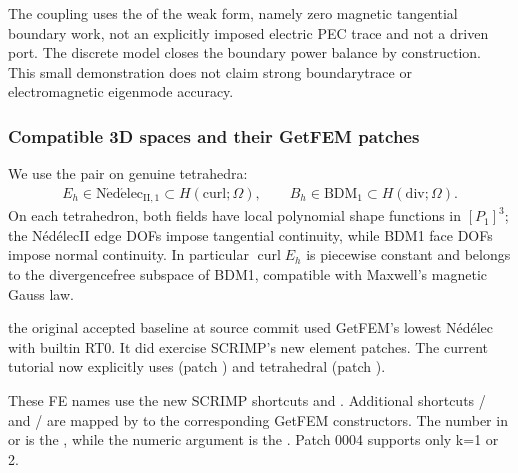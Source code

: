 \documentclass[letterpaper,10pt,english]{sphinxmanual}
\begin{document}
\sphinxAtStartPar
The coupling uses the  of the weak form, namely
zero magnetic tangential boundary work, not an
explicitly imposed electric PEC trace and not
a driven port. The discrete model closes the
boundary power balance by construction. This
small demonstration does not claim strong
boundary\sphinxhyphen{}trace or electromagnetic eigenmode
accuracy.


\subsubsection{Compatible 3D spaces and their GetFEM patches}
\label{\detokenize{examples/maxwell_3d:compatible-3d-spaces-and-their-getfem-patches}}
\sphinxAtStartPar
We use the  pair on genuine tetrahedra:
\begin{equation*}
\begin{split}E_h \in \mathrm{N\acute ed\acute elec}_{\mathrm{II},1}
     \subset H(\mathrm{curl};\Omega),\qquad
B_h \in \mathrm{BDM}_1
     \subset H(\mathrm{div};\Omega).\end{split}
\end{equation*}
\sphinxAtStartPar
On each tetrahedron, both fields have local polynomial
shape functions in \([P_1]^3\); the Nédélec\sphinxhyphen{}II
edge DOFs impose tangential continuity, while BDM1
face DOFs impose normal continuity. In particular
\(\operatorname{curl} E_h\) is piecewise
constant and belongs to the divergence\sphinxhyphen{}free
subspace of BDM1, compatible with Maxwell’s
magnetic Gauss law.

\sphinxAtStartPar
{} the original accepted
baseline at source commit  used
GetFEM’s  lowest Nédélec
 with built\sphinxhyphen{}in RT0. It
did  exercise SCRIMP’s new element patches.
The current tutorial now explicitly uses
 (patch ) and
tetrahedral  (patch ).

\sphinxAtStartPar
These FE names use the new SCRIMP shortcuts
 and
. Additional
shortcuts  /  and
 /  are mapped by
 to the corresponding
GetFEM constructors. The number in
 or  is the , while the numeric argument
is the . Patch 0004
supports only k=1 or 2.
\end{document}
